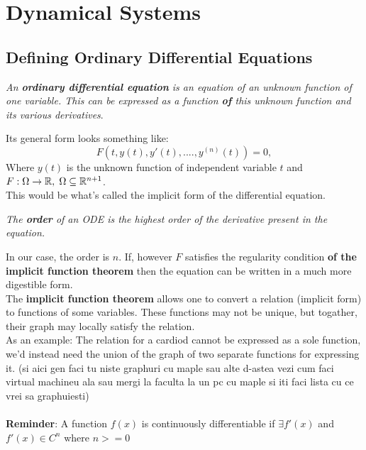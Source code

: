 \chapter{Dynamical Systems}
\label{chap:ch3}


\section{Defining Ordinary Differential Equations}
\begin{definition}
    \textit{An \textbf{ordinary differential equation} is an equation of an unknown function of one variable. This can be expressed as a function \textbf{of} this unknown function and its various derivatives}.
\end{definition}
Its general form looks something like:
\begin{equation}\label{eq:3.1.1}
    F(t,y(t),y'(t),....,y^{(n)}(t))=0,
\end{equation}
Where $y(t)$ is the unknown function of independent variable $t$ and $F : \Omega \rightarrow \mathbb{R},\hspace{0.1cm}\Omega \subseteq \mathbb{R}^{n+1}$. \\
This would be what's called the implicit form of the differential equation.

\begin{definition}
    \textit{The \textbf{order} of an ODE is the highest order of the derivative present in the equation.}
\end{definition}
In our case, the order is $n$.
If, however $F$ satisfies the regularity condition \textbf{of the implicit function theorem} then the equation can be written in a much more digestible form. \\

The \textbf{implicit function theorem} allows one to convert a relation (implicit form) to functions of some variables. These functions may not be unique, but togather, their graph may locally satisfy the relation. \\
As an example: The relation for a cardiod cannot be expressed as a sole function, we'd instead need the union of the graph of two separate functions for expressing it.
(si aici gen faci tu niste graphuri cu maple sau alte d-astea vezi cum faci virtual machineu ala sau mergi la faculta la un pc cu maple si iti faci lista cu ce vrei sa graphuiesti) \\ \\
\textbf{Reminder}: A function $f(x)$ is continuously differentiable if $\exists f'(x)$ and $f'(x) \in C^n$ where $n>=0$

